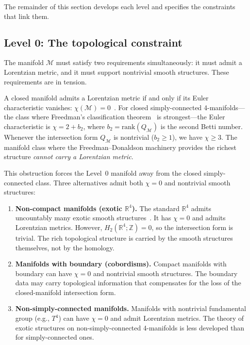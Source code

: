 \documentclass[12pt,a4paper]{article}
\theoremstyle{definition}
\theoremstyle{remark}
\begin{document}
The remainder of this section develops each level and specifies the
constraints that link them.

\subsection{Level 0: The topological constraint}
\label{sec:level0}

The manifold $\mathcal{M}$ must satisfy two requirements simultaneously:
it must admit a Lorentzian metric, and it must support nontrivial smooth
structures. These requirements are in tension.

A closed manifold admits a Lorentzian metric if and only if its Euler
characteristic vanishes: $\chi(\mathcal{M}) = 0$~\cite{markus}. For
closed simply-connected 4-manifolds---the class where Freedman's
classification theorem~\cite{freedman} is strongest---the Euler
characteristic is $\chi = 2 + b_2$, where $b_2 = \mathrm{rank}(Q_\mathcal{M})$
is the second Betti number. Whenever the intersection form $Q_\mathcal{M}$ is
nontrivial ($b_2 \geq 1$), we have $\chi \geq 3$. The manifold class
where the Freedman--Donaldson machinery provides the richest structure
\emph{cannot carry a Lorentzian metric}.

This obstruction forces the Level~0 manifold away from the closed
simply-connected class. Three alternatives admit both $\chi = 0$ and
nontrivial smooth structures:

\begin{enumerate}
\item \textbf{Non-compact manifolds (exotic $\mathbb{R}^4$).} The
standard $\mathbb{R}^4$ admits uncountably many exotic smooth
structures~\cite{donaldson,taubes}. It has $\chi = 0$ and admits
Lorentzian metrics. However, $H_2(\mathbb{R}^4;\mathbb{Z}) = 0$, so
the intersection form is trivial. The rich topological structure is
carried by the smooth structures themselves, not by the homology.

\item \textbf{Manifolds with boundary (cobordisms).} Compact manifolds
with boundary can have $\chi = 0$ and nontrivial smooth structures. The
boundary data may carry topological information that compensates for the
loss of the closed-manifold intersection form.

\item \textbf{Non-simply-connected manifolds.} Manifolds with nontrivial
fundamental group (e.g., $T^4$) can have $\chi = 0$ and admit Lorentzian
metrics. The theory of exotic structures on non-simply-connected
4-manifolds is less developed than for simply-connected ones.
\end{enumerate}
\end{document}
